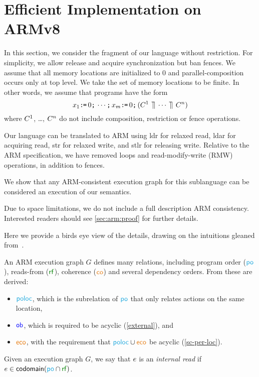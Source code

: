 \section{Efficient Implementation on ARMv8}
\label{sec:arm}

In this section, we consider the fragment of our language without
restriction.  For simplicity, we allow release and acquire synchronization
but ban fences.  We assume that all memory locations are initialized to $0$
and parallel-composition occurs only at top level.  We take the set of memory
locations to be finite.  In other words, we assume that programs have the
form
\begin{displaymath}
  {x_1}\texttt{:}\mkern-1mu\texttt{=}\,{0}\texttt{;}\,
  \cdots\texttt{;}\,
  {x_m}\texttt{:}\mkern-1mu\texttt{=}\,{0}\texttt{;}\,
  (C^1 \,\mathbin{\rrceil}\, \cdots \,\mathbin{\rrceil}\, C^n)
\end{displaymath}
where $C^1$, \ldots, $C^n$ do not include composition, restriction or
fence operations.

Our language can be translated to ARM using \textsf{ldr} for relaxed read,
\textsf{ldar} for acquiring read, \textsf{str} for relaxed write, and
\textsf{stlr} for releasing write.  Relative to the ARM specification, we
have removed loops and read-modify-write (RMW) operations, in addition to
fences.

We show that any ARM-consistent execution graph for this sublanguage can be
considered an execution of our semantics.  


Due to space limitations, we do not include a full description ARM
consistency.  Interested readers should see \textsection\ref{sec:arm:proof}
for further details.  

Here we provide a birds eye view of the details, drawing on the intuitions gleaned from~\citet{DBLP:journals/pacmpl/PulteFDFSS18}.  

An ARM execution graph $G$ defines many relations, including program order
($\rpox$), reads-from ($\rrfx$), coherence ($\rco$) and several dependency
orders.  From these are derived:
\begin{itemize}
\item ${\rpoloc}$, which is the subrelation of $\rpox$ that only relates
  actions on the same location,
\item ${\mathrel{\color{blue}\mathsf{ob}}}$, which is required to be acyclic (\ref{external}), and
\item $\reco$, with the requirement that ${\rpoloc}\cup{\reco}$ be acyclic (\ref{sc-per-loc}).
\end{itemize}
Given an execution graph $G$, we say that $e$ is an \emph{internal read} if $\aEv\in\fcodom({\rpox}\cap {\rrfx})$.

